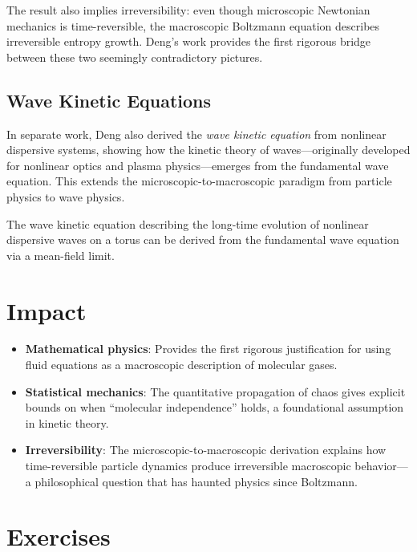 \begin{highlightbox}
The result also implies irreversibility: even though microscopic Newtonian mechanics is time-reversible, the macroscopic Boltzmann equation describes irreversible entropy growth. Deng's work provides the first rigorous bridge between these two seemingly contradictory pictures.
\end{highlightbox}

\subsection{Wave Kinetic Equations}

In separate work, Deng also derived the \emph{wave kinetic equation} from nonlinear dispersive systems, showing how the kinetic theory of waves---originally developed for nonlinear optics and plasma physics---emerges from the fundamental wave equation. This extends the microscopic-to-macroscopic paradigm from particle physics to wave physics.

\begin{theorem}[Deng, 2025]
The wave kinetic equation describing the long-time evolution of nonlinear dispersive waves on a torus can be derived from the fundamental wave equation via a mean-field limit.
\end{theorem}

\section{Impact}
\begin{itemize}
\item \textbf{Mathematical physics}: Provides the first rigorous justification for using fluid equations as a macroscopic description of molecular gases.
\item \textbf{Statistical mechanics}: The quantitative propagation of chaos gives explicit bounds on when ``molecular independence'' holds, a foundational assumption in kinetic theory.
\item \textbf{Irreversibility}: The microscopic-to-macroscopic derivation explains how time-reversible particle dynamics produce irreversible macroscopic behavior---a philosophical question that has haunted physics since Boltzmann.
\end{itemize}

\section{Exercises}

